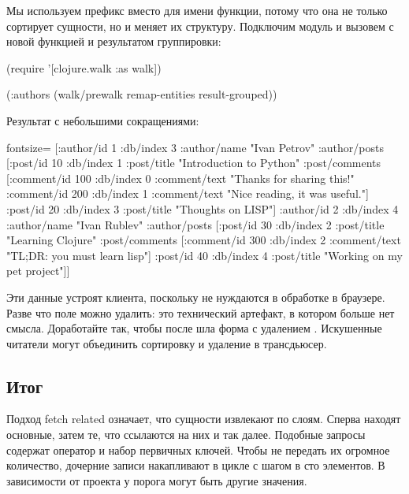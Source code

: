 Мы используем префикс  вместо  для имени функции, потому что она не только сортирует сущности, но и меняет их структуру. Подключим модуль  и вызовем  с новой функцией и результатом группировки:

\begin{english}
  \begin{clojure}
(require '[clojure.walk :as walk])

(:authors
 (walk/prewalk remap-entities result-grouped))
  \end{clojure}
\end{english}

Результат с небольшими сокращениями:

\begin{english}
  \begin{clojure*}{fontsize=\small}
[{:author/id 1
  :db/index 3
  :author/name "Ivan Petrov"
  :author/posts
  [{:post/id 10
    :db/index 1
    :post/title "Introduction to Python"
    :post/comments
    [{:comment/id 100
      :db/index 0
      :comment/text "Thanks for sharing this!"}
     {:comment/id 200
      :db/index 1
      :comment/text "Nice reading, it was useful."}]}
   {:post/id 20
    :db/index 3
    :post/title "Thoughts on LISP"}]}
 {:author/id 2
  :db/index 4
  :author/name "Ivan Rublev"
  :author/posts
  [{:post/id 30
    :db/index 2
    :post/title "Learning Clojure"
    :post/comments
    [{:comment/id 300
      :db/index 2
      :comment/text "TL;DR: you must learn lisp"}]}
   {:post/id 40
    :db/index 4
    :post/title "Working on my pet project"}]}]
  \end{clojure*}
\end{english}

Эти данные устроят клиента, поскольку не нуждаются в обработке в браузере. Разве что поле  можно удалить: это технический артефакт, в котором больше нет смысла. Доработайте  так, чтобы после  шла форма с удалением . Искушенные читатели могут объединить сортировку и удаление в трансдьюсер.

\subsection{Итог}

Подход fetch related означает, что сущности извлекают по слоям. Сперва находят основные, затем те, что ссылаются на них и так далее. Подобные запросы содержат оператор  и набор первичных ключей. Чтобы не передать их огромное количество, дочерние записи накапливают в цикле с шагом в сто элементов. В зависимости от проекта у порога могут быть другие значения.

